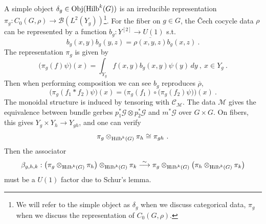 \documentclass[a4paper,11pt]{article}
\newcommand{\be}{\begin{equation}}
\newcommand{\ee}{\end{equation}}
\def\CC{\mathcal{C}}
\def\hilb{{\rm Hilb}}
\begin{document}
A simple object $\delta_g\in {\rm Obj}(\hilb^k(G))$ is an irreducible representation $\pi_g : C_0(G,\rho) \to \mathscr{B}( L^2(Y_g) )$\footnote{We will refer to the simple object as $\delta_g$ when we discuss categorical data, $\pi_g$ when we discuss the representation of $C_0(G,\rho)$.}. For the fiber on $g\in G$, the Čech cocycle data $\rho$ can be represented by a function $b_g: Y^{[2]}\to U(1)$ s.t.
\be b_g(x,y) b_g(y,z) = \overline{\rho(x,y,z)}  b_g(x,z) \ . \ee
The representation $\pi_g$ is given by
\be \big(\pi_g(f)\psi\big)(x) = \int_{Y_g} f(x,y) b_g(x,y) \psi(y) \, dy  \ , \ x\in Y_g \ . \ee
Then when performing composition we can see $b_g$ reproduces $\overline{\rho}$,
\be
\big(\pi_g(f_1*f_2)\psi\big)(x) = \Big(\pi_g(f_1)\circ \big(\pi_g(f_2) \psi\big) \Big)(x) \ .
\ee
The monoidal structure is induced by tensoring with $\CC_\mathscr{M}$. The data $\mathscr{M}$ gives the equivalence between bundle gerbes $p_1^*\mathscr{G}\otimes p^*_2\mathscr{G}$ and $m^*\mathscr{G}$ over $G\times G$. On fibers, this gives $Y_g\times Y_h\to Y_{gh}$, and one can verify
\be  \pi_g \otimes_{\hilb^k(G)}\pi_h \cong \pi_{gh} \ . \ee
Then the associator
\be \beta_{g,h,k}: \big(\pi_g \otimes_{\hilb^k(G)} \pi_h\big) \otimes_{\hilb^k(G)} \pi_k \stackrel{\sim}{\longrightarrow} \pi_g \otimes_{\hilb^k(G)} \big(\pi_h \otimes_{\hilb^k(G)} \pi_k \big) \ee
must be a $U(1)$ factor due to Schur's lemma. 
\end{document}
